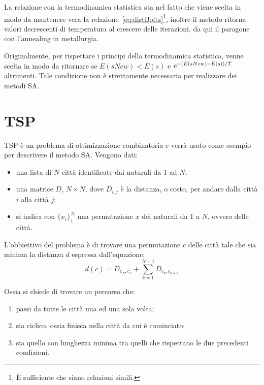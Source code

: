 La relazione con la termodinamica statistica sta nel fatto che
 viene scelta in modo da mantenere vera la
relazione~\eqref{eq:distBoltz}\footnote{\`E sufficiente che siano relazioni simili.},
inoltre il metodo  ritorna
valori decrescenti di temperatura al crescere delle iterazioni, da qui
il paragone con l'annealing in metallurgia.

Originalmente, per
rispettare i principi della termodinamica statistica,  venne
scelta in modo da ritornare  se
$E(sNew)<E(s)$ e $\mathrm{e}^{-(E(sNew)-E(s))/T}$ altrimenti. Tale
condizione non \`e strettamente necessaria per realizzare dei metodi
\ac{SA}.

\section{\acf{TSP}}
\ac{TSP} \`e un problema di ottimizzazione combinatoria e verr\`a
usato come esempio per descrivere il metodo \ac{SA}. Vengono dati:
\begin{itemize}
\item una lista di $N$ citt\`a identificate dai naturali da $1$ ad $N$;
\item una matrice $D$, $N\times N$, dove $D_{i,j}$ \`e la distanza, o
  costo, per andare dalla citt\`a $i$ alla citt\`a $j$;
\item si indica con $\{x_i\}_1^N$ una permutazione $x$ dei naturali da
  $1$ a $N$, ovvero delle citt\`a.
\end{itemize}
L'obbiettivo del problema \`e di trovare una permutazione $c$ delle
citt\`a tale che sia minima la distanza $d$ espressa dall'equazione:
\begin{equation}\label{eq:distanzaTSP}
  d(c) = D_{c_N,c_1}+\sum_{k=1}^{N-1}D_{c_k,c_{k+1}}
\end{equation}

Ossia si chiede di trovare un percorso che:
\begin{enumerate}
\item passi da tutte le citt\`a
  una ed una sola volta;
\item sia ciclico, ossia finisca nella citt\`a da cui \`e cominciato;
\item sia quello con lunghezza minima tra quelli che rispettano le due
  precedenti condizioni.
\end{enumerate}

